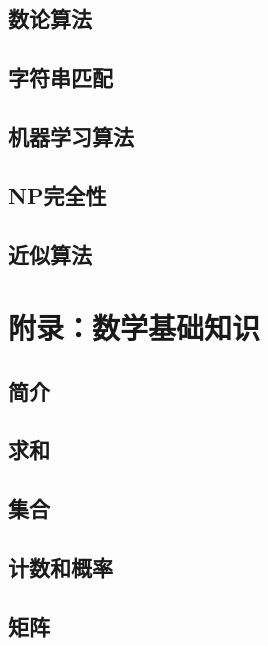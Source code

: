 \documentclass[lang=cn,newtx,10pt,scheme=chinese]{elegantbook}
\begin{document}
\chapter{数论算法}

\chapter{字符串匹配}

\chapter{机器学习算法}

\chapter{NP完全性}

\chapter{近似算法}

\part{附录：数学基础知识}

\chapter*{简介}

\chapter*{求和}

\chapter*{集合}

\chapter*{计数和概率}

\chapter*{矩阵}
\end{document}
